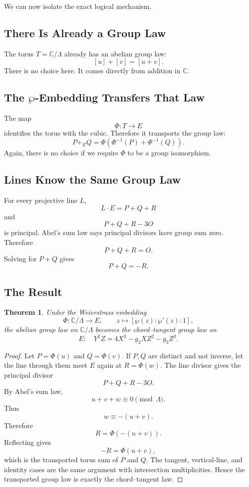 \documentclass[11pt]{article}
\newcommand{\C}{\mathbb{C}}
\newtheorem*{theorem}{Theorem}
\begin{document}
We can now isolate the exact logical mechanism.

\subsection{There Is Already a Group Law}

The torus \(T=\C/\Lambda\) already has an abelian group law:
\[
[u]+[v]=[u+v].
\]
There is no choice here.  It comes directly from addition in \(\C\).

\subsection{\texorpdfstring{The \(\wp\)-Embedding Transfers That Law}{The wp-Embedding Transfers That Law}}

The map
\[
\Phi:T\to E
\]
identifies the torus with the cubic.  Therefore it transports the group law:
\[
P+_E Q
=
\Phi(\Phi^{-1}(P)+\Phi^{-1}(Q)).
\]
Again, there is no choice if we require \(\Phi\) to be a group
isomorphism.

\subsection{Lines Know the Same Group Law}

For every projective line \(L\),
\[
L\cdot E=P+Q+R
\]
and
\[
P+Q+R-3O
\]
is principal.  Abel's sum law says principal divisors have group sum zero.
Therefore
\[
P+Q+R=O.
\]
Solving for \(P+Q\) gives
\[
P+Q=-R.
\]

\subsection{The Result}

\begin{theorem}
Under the Weierstrass embedding
\[
\Phi:\C/\Lambda\to E,\qquad z\mapsto[\wp(z):\wp'(z):1],
\]
the abelian group law on \(\C/\Lambda\) becomes the chord--tangent group law
on
\[
E:\quad Y^2Z=4X^3-g_2XZ^2-g_3Z^3.
\]
\end{theorem}

\begin{proof}
Let \(P=\Phi(u)\) and \(Q=\Phi(v)\).  If \(P,Q\) are distinct and not
inverse, let the line through them meet \(E\) again at \(R=\Phi(w)\).  The
line divisor gives the principal divisor
\[
P+Q+R-3O.
\]
By Abel's sum law,
\[
u+v+w\equiv0\pmod{\Lambda}.
\]
Thus
\[
w\equiv-(u+v).
\]
Therefore
\[
R=\Phi(-(u+v)).
\]
Reflecting gives
\[
-R=\Phi(u+v),
\]
which is the transported torus sum of \(P\) and \(Q\).  The tangent,
vertical-line, and identity cases are the same argument with intersection
multiplicities.  Hence the transported group law is exactly the
chord--tangent law.
\end{proof}
\end{document}
